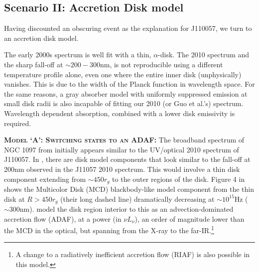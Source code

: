 \documentclass[11pt,a4paper]{article}
\begin{document}
\subsection*{Scenario II: Accretion Disk model}
Having discounted an obscuring event as the explanation for J110057,
we turn to an accretion disk model.

The early 2000s spectrum is well fit with a thin, \citet{SS73}
$\alpha$-disk. The 2010 spectrum and the sharp fall-off
at $\sim 200-300$nm, is not reproducible using a different temperature
profile alone, even one where the entire inner disk (unphysically)
vanishes. This is due to the width of the Planck function in
wavelength space.
For the same reasons, a gray absorber
model with uniformly suppressed emission at small disk radii is also
incapable of fitting our 2010 (or Guo et al.'s) spectrum. 
Wavelength dependent absorption, combined with a lower
disk emissivity is required. 

\smallskip \smallskip
\noindent
\textbf{\textsc{Model `A': Switching states to an ADAF: }}
The broadband spectrum of NGC 1097 from \citet{Nemmen2006} initially appears similar
to the UV/optical 2010 spectrum of J110057.  In \citet[][e.g., their
Figure 4]{Nemmen2006}, there are disk model components that look
similar to the fall-off at 200nm observed in the J11057 2010 spectrum.
This would involve a thin disk component extending from $\sim
450r_{g}$ to the outer regions of the disk. Figure 4 in
\citet{Nemmen2006} shows the Multicolor Disk (MCD) blackbody-like
model component from the thin disk at $R>450r_{g}$ (their long dashed
line) dramatically decreasing at $\sim 10^{15}$Hz ($\sim 300$nm).
\citet{Nemmen2006} model the disk region interior to this as 
an advection-dominated accretion flow (ADAF), at a power (in $\nu
L_{\nu}$), an order of magnitude lower than the MCD in the optical,
but spanning from the X-ray to the far-IR.\footnote{A change to 
a radiatively inefficient accretion flow (RIAF) is also possible in 
this model.}
\end{document}
